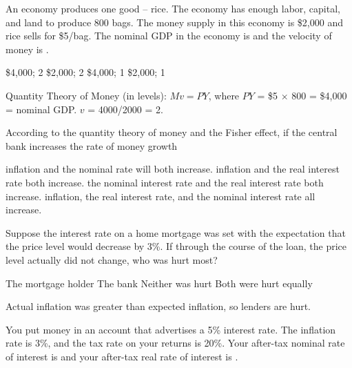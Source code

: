 \documentclass[addpoints,11pt]{exam}
\theoremstyle{definition}
\newcommand{\blank}[0]{\underline{\hspace{3cm}}}
\begin{document}
\begin{questions}
	
	\question An economy produces one good -- rice. The economy has enough labor, capital, and land to produce 800 bags. The money supply in this economy is \$2,000 and rice sells for \$5/bag. The nominal GDP in the economy is \blank and the velocity of money is \blank.
	
	\begin{choices}
		\CorrectChoice \$4,000; 2
		\choice \$2,000; 2
		\choice \$4,000; 1
		\choice \$2,000; 1
	\end{choices}
	
	\begin{solution}
		Quantity Theory of Money (in levels): $Mv=PY$, where $PY$ = \$5 $\times$ 800 = \$4,000 = nominal GDP. $v$ = 4000/2000 = 2.
	\end{solution}
	
	\question According to the quantity theory of money and the Fisher effect, if the central bank increases the rate of money growth
	
	\begin{choices}
		\CorrectChoice inflation and the nominal rate will both increase. 
		\choice inflation and the real interest rate both increase.
		\choice the nominal interest rate and the real interest rate both increase.
		\choice inflation, the real interest rate, and the nominal interest rate all increase.
	\end{choices}

	\question Suppose the interest rate on a home mortgage was set with the expectation that the price level would decrease by 3\%. If through the course of the loan, the price level actually did not change, who was hurt most?
	
	\begin{choices}
		\choice The mortgage holder
		\CorrectChoice The bank
		\choice Neither was hurt
		\choice Both were hurt equally
	\end{choices}
	
	\begin{solution}
		Actual inflation was greater than expected inflation, so lenders are hurt.
	\end{solution}
	
	\question You put money in an account that advertises a 5\% interest rate. The inflation rate is 3\%, and the tax rate on your returns is 20\%. Your after-tax nominal rate of interest is \blank and your after-tax real rate of interest is \blank.
	

\end{questions}
\end{document}
